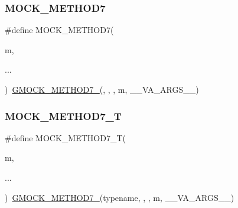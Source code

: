 \mbox{\label{_obj__test_2lib_2googletest-release-1_88_81_2googlemock_2include_2gmock_2gmock-generated-function-mockers_8h_a01f3369877a0c52f59c006fbd54b6a10}} 
\subsubsection{\texorpdfstring{MOCK\_METHOD7}{MOCK\_METHOD7}}
{\footnotesize\ttfamily \#define M\+O\+C\+K\+\_\+\+M\+E\+T\+H\+O\+D7(\begin{DoxyParamCaption}\item[{}]{m,  }\item[{}]{... }\end{DoxyParamCaption})~\mbox{\hyperlink{_obj__test_2lib_2googletest-release-1_88_81_2googlemock_2include_2gmock_2gmock-generated-function-mockers_8h_ab98a8399ba62b53b375c2807f4d39d2f}{G\+M\+O\+C\+K\+\_\+\+M\+E\+T\+H\+O\+D7\+\_\+}}(, , , m, \+\_\+\+\_\+\+V\+A\+\_\+\+A\+R\+G\+S\+\_\+\+\_\+)}

\mbox{\label{_obj__test_2lib_2googletest-release-1_88_81_2googlemock_2include_2gmock_2gmock-generated-function-mockers_8h_a31bdd1d1448052f4122ecebf937a8f44}} 
\subsubsection{\texorpdfstring{MOCK\_METHOD7\_T}{MOCK\_METHOD7\_T}}
{\footnotesize\ttfamily \#define M\+O\+C\+K\+\_\+\+M\+E\+T\+H\+O\+D7\+\_\+T(\begin{DoxyParamCaption}\item[{}]{m,  }\item[{}]{... }\end{DoxyParamCaption})~\mbox{\hyperlink{_obj__test_2lib_2googletest-release-1_88_81_2googlemock_2include_2gmock_2gmock-generated-function-mockers_8h_ab98a8399ba62b53b375c2807f4d39d2f}{G\+M\+O\+C\+K\+\_\+\+M\+E\+T\+H\+O\+D7\+\_\+}}(typename, , , m, \+\_\+\+\_\+\+V\+A\+\_\+\+A\+R\+G\+S\+\_\+\+\_\+)}

